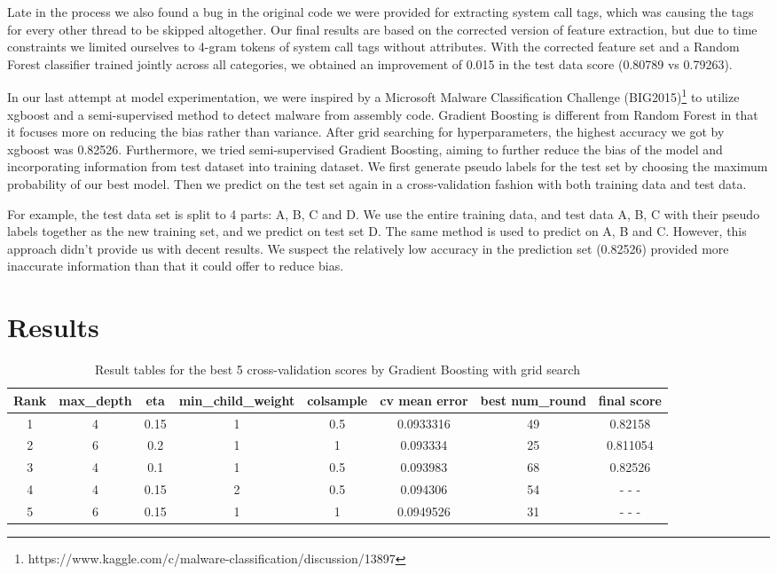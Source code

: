 \documentclass[11pt]{article}
\begin{document}
\begin{enumerate}
Late in the process we also found a bug in the original code we were provided for extracting system call tags, which was causing the tags for every other thread to be skipped altogether. Our final results are based on the corrected version of feature extraction, but due to time constraints we limited ourselves to 4-gram tokens of system call tags without attributes. With the corrected feature set and a Random Forest classifier trained jointly across all categories, we obtained an improvement of 0.015 in the test data score (0.80789 vs 0.79263).

In our last attempt at model experimentation, we were inspired by a Microsoft Malware Classification Challenge (BIG2015)\footnote{https://www.kaggle.com/c/malware-classification/discussion/13897} to utilize xgboost and a semi-supervised method to detect malware from assembly code. Gradient Boosting is different from Random Forest in that it focuses more on reducing the bias rather than variance. After grid searching for hyperparameters, the highest accuracy we got by xgboost was 0.82526. Furthermore, we tried semi-supervised Gradient Boosting, aiming to further reduce the bias of the model and incorporating information from test dataset into training dataset. We first generate pseudo labels for the test set by choosing the maximum probability of our best model. Then we predict on the test set again in a cross-validation fashion with both training data and test data.

For example, the test data set is split to 4 parts: A, B, C and D. We use the entire training data, and test data A, B, C with their pseudo labels together as the new training set, and we predict on test set D. The same method is used to predict on A, B and C. However, this approach didn't provide us with decent results. We suspect the relatively low accuracy in the prediction set (0.82526) provided more inaccurate information than that it could offer to reduce bias.
 
\end{enumerate}


\section{Results}

\begin{table}
\centering
\begin{tabular}{cccccccc}
 \toprule
 Rank & max\_depth & eta & min\_child\_weight & colsample & cv mean error & best num\_round & final score\\
 \midrule
  1 & 4 & 0.15 & 1 & 0.5 & 0.0933316 & 49 & 0.82158\\
  2 & 6 & 0.2 & 1 & 1 & 0.093334 & 25 & 0.811054\\
  3 & 4 & 0.1 & 1 & 0.5 & 0.093983 & 68 & 0.82526\\
  4 & 4 & 0.15 & 2 & 0.5 & 0.094306 & 54 & - - -\\
  5 & 6 & 0.15 & 1 & 1 & 0.0949526 & 31 & - - -\\
 \bottomrule
\end{tabular}
\caption{\label{tab:results} Result tables for the best 5 cross-validation scores by Gradient Boosting with grid search}
\end{table}
\end{document}
